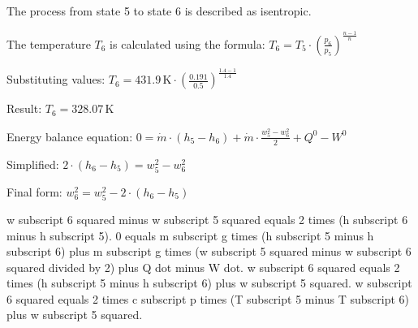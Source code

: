 The process from state 5 to state 6 is described as isentropic.  

The temperature \( T_6 \) is calculated using the formula:  
\( T_6 = T_5 \cdot \left( \frac{p_6}{p_5} \right)^{\frac{n-1}{n}} \)  

Substituting values:  
\( T_6 = 431.9 \, \text{K} \cdot \left( \frac{0.191}{0.5} \right)^{\frac{1.4-1}{1.4}} \)  

Result:  
\( T_6 = 328.07 \, \text{K} \)  

Energy balance equation:  
\( 0 = \dot{m} \cdot (h_5 - h_6) + \dot{m} \cdot \frac{w_5^2 - w_6^2}{2} + Q^0 - W^0 \)  

Simplified:  
\( 2 \cdot (h_6 - h_5) = w_5^2 - w_6^2 \)  

Final form:  
\( w_6^2 = w_5^2 - 2 \cdot (h_6 - h_5) \)

w subscript 6 squared minus w subscript 5 squared equals 2 times (h subscript 6 minus h subscript 5).  
0 equals m subscript g times (h subscript 5 minus h subscript 6) plus m subscript g times (w subscript 5 squared minus w subscript 6 squared divided by 2) plus Q dot minus W dot.  
w subscript 6 squared equals 2 times (h subscript 5 minus h subscript 6) plus w subscript 5 squared.  
w subscript 6 squared equals 2 times c subscript p times (T subscript 5 minus T subscript 6) plus w subscript 5 squared.